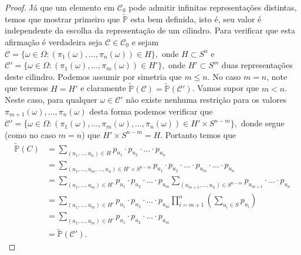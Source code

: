 \begin{proof}
Já que um elemento em $\mathscr{C}_0$ pode admitir infinitas 
representações distintas, temos que mostrar primeiro que 
$\widetilde{\mathbb{P}}$ esta bem definida, isto é, seu valor é independente
da escolha da representação de um cilindro. 
Para verificar que esta afirmação é verdadeira 
seja $\mathcal{C}\in\mathscr{C}_0$ e sejam 
$
\mathcal{C}
=
\{
\omega\in \Omega:
(\pi_1(\omega), \ldots,\pi_n(\omega)) \in H
\},
$
onde $H\subset S^n$ e 
$
\mathcal{C}'
=
\{
\omega\in \Omega:
(\pi_1(\omega), \ldots,\pi_m(\omega)) \in H'
\},
$
onde $H'\subset S^m$ duas representações 
deste cilindro. 
Podemos assumir por simetria que $m\leq n$.
No caso $m=n$, note que teremos $ H=H'$ e claramente
$
\widetilde{\mathbb{P}}(\mathcal{C})
=
\widetilde{\mathbb{P}}(\mathcal{C}')
$.
Vamos supor que $m<n$. Neste caso, para qualquer $\omega\in\mathcal{C}'$
não existe nenhuma restrição para os
valores $\pi_{m+1}(\omega),\ldots,\pi_n(\omega)$
desta forma podemos verificar que 
$
\mathcal{C}' 
= 
\{
\omega\in \Omega:
(\pi_1(\omega), \ldots,\pi_m(\omega),\ldots,\pi_n(\omega)) 
\in H'\times S^{n-m} 
\},
$
donde segue (como no caso $m=n$) que $H'\times S^{n-m} = H$.
Portanto temos que 
\begin{align*}
\widetilde{\mathbb{P}}(C)
&=
\sum_{(u_1,\ldots,u_n)\in H} 
p_{u_1}\cdot p_{u_2}\cdot\ldots\cdot p_{u_n}
\\[0.3cm]
&=
\sum_{(u_1,\ldots,u_m,\ldots,u_n)\in H'\times S^{n-m}} 
p_{u_1}\cdot p_{u_2}\cdot\ldots\cdot p_{u_m}\cdot\ldots\cdot p_{u_n}
\\[0.3cm]
&=
\sum_{(u_1,\ldots,u_m)\in H'}
p_{u_1}\cdot p_{u_2}\cdot\ldots\cdot p_{u_m}
\sum_{(u_{m+1},\ldots,u_n)\in S^{n-m}} 
p_{u_{m+1}}\cdot\ldots\cdot p_{u_n}
\\[0.3cm]
&=
\sum_{(u_1,\ldots,u_m)\in H'}
p_{u_1}\cdot p_{u_2}\cdot\ldots\cdot p_{u_m}
\prod_{i=m+1}^n
\left( 
	\sum_{u_{i}\in S} p_{u_{i}}
\right)
\\[0.3cm]
&=
\sum_{(u_1,\ldots,u_m)\in H'}
p_{u_1}\cdot p_{u_2}\cdot\ldots\cdot p_{u_m}
\\[0.3cm]
&=
\widetilde{\mathbb{P}}(\mathcal{C}').
\end{align*}



\end{proof}
